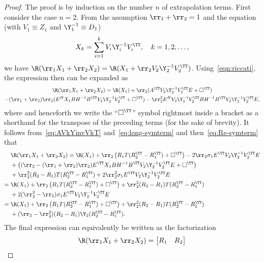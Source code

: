 \begin{proof}
The proof is by induction on the number $n$ of extrapolation terms. First consider the case $n=2$. From the
assumption $\rr_1+\rr_2 = 1$ and the equation (with $V_1\equiv Z_1$ and $\Y_1^{-1}\equiv D_1$)
\begin{equation}\label{eq:X_k}
	X_k=\sum_{i=1}^{k}V_i\Y_i^{-1}V_i^\TT, \quad k=1,2,\dots,
\end{equation}
we have $\R(\rr_1X_1 + \rr_2X_2) =	\R(X_1 + \rr_2 V_2\Y_2^{-1}V_2^\TT)$. Using~\eqref{eqn:riccati},
the expression then can be expanded as
\begin{multline*}
	\R(\rr_1X_1 + \rr_2X_2) = \R(X_1) + \rr_2(A^\TT V_2\Y_2^{-1}V_2^\TT E + \square^\TT) \\
	-(\rr_1+\rr_2)\rr_2(E^{H} X_1BH^{-1} B^\TT V_2\Y_2^{-1}V_2^\TT+\square^\TT)
	- \rr_2^2 E^{H}V_2\Y_2^{-1}V_2^\TT BH^{-1}B^\TT V_2\Y_2^{-1}V_2^\TT E,
\end{multline*}
where and henceforth we write the ``$\square^\TT$'' symbol rightmost inside a bracket as a shorthand for the transpose of the preceding terms (for the sake of brevity).
It follows from~\eqref{eq:AVkYinvVkT} and~\eqref{eq:long-symterm} and then~\eqref{eq:Re-symterm} that
\begin{align*}
	& \R(\rr_1X_1 + \rr_2X_2)= \R(X_1) + \rr_2\left(R_{1}T(R_2^\TT-R_{1}^\TT)
		+\square^\TT\right) - 2\rr_2\sigma_1 E^\TT V_2\Y_2^{-1}V_2^\TT E \\
	& + \big((\rr_2-(\rr_1+\rr_2)\rr_2)
		E^\TT X_1BH^{-1}B^\TT V_2\Y_2^{-1}V_2^\TT E+\square^\TT\big) \\
	& + \rr_2^2(R_2-R_{1})T(R_2^\TT-R_{1}^\TT) +
		2\rr_2^2\sigma_1E ^\TT V_2\Y_2^{-1}V_2^\TT E
	\\
	={}& \R(X_1) + \rr_2\left(R_{1}T(R_2^\TT-R_{1}^\TT) +\square^\TT\right)
	+ \rr_2^2(R_2-R_{1})T(R_2^\TT-R_{1}^\TT) \\
	& + 2(\rr_2^2-\rr_2)\sigma_1E^\TT V_2\Y_2^{-1}V_2^\TT E
	\\
	={}& \R(X_1) + \rr_2\left(R_{1}T(R_2^\TT-R_{1}^\TT) +\square^\TT\right)
	+ \rr_2^2(R_2-R_{1})T(R_2^\TT-R_{1}^\TT) \\
	& + (\rr_2-\rr_2^2)(R_2-R_{1})\Y_2(R_2^\TT-R_{1}^\TT).
\end{align*}
The final expression can equivalently be written as the factorization
\begin{equation*}%
	\R(\rr_1X_1 + \rr_2X_2) =
	\begin{bmatrix}
		R_1 & R_2

\end{bmatrix}
\end{equation*}
\end{proof}
